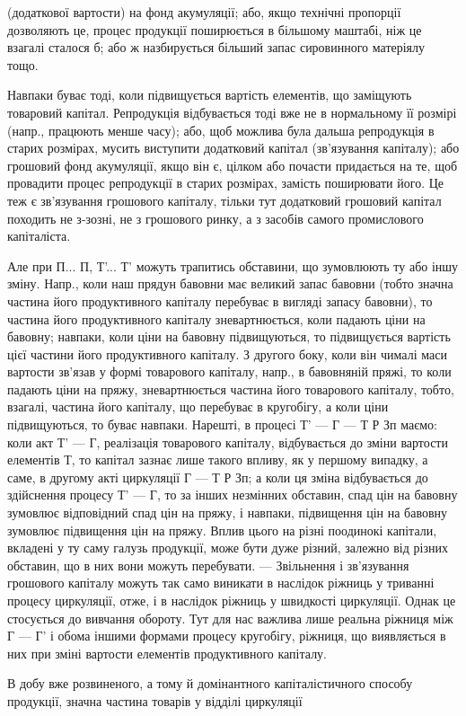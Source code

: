 \parcont{}  %
(додаткової вартости) на фонд акумуляції; або, якщо технічні пропорції
дозволяють це, процес продукції поширюється в більшому маштабі,
ніж це взагалі сталося б; або ж назбирується більший запас сировинного
матеріялу тощо.

Навпаки буває тоді, коли підвищується вартість елементів, що заміщують
товаровий капітал. Репродукція відбувається тоді вже не в нормальному
її розмірі (напр., працюють менше часу); або, щоб можлива
була дальша репродукція в старих розмірах, мусить виступити додатковий
капітал (зв’язування капіталу); або грошовий фонд акумуляції, якщо він
є, цілком або почасти придається на те, щоб провадити процес репродукції
в старих розмірах, замість поширювати його. Це теж є зв’язування
грошового капіталу, тільки тут додатковий грошовий капітал походить
не з-зозні, не з грошового ринку, а з засобів самого промислового
капіталіста.

Але при П... П, Т'... Т' можуть трапитись обставини, що зумовлюють
ту або іншу зміну. Напр., коли наш прядун бавовни має великий
запас бавовни (тобто значна частина його продуктивного капіталу
перебуває в вигляді запасу бавовни), то частина його продуктивного
капіталу зневартнюється, коли падають ціни на бавовну; навпаки, коли ціни
на бавовну підвищуються, то підвищується вартість цієї частини його
продуктивного капіталу. З другого боку, коли він чималі маси вартости
зв’язав у формі товарового капіталу, напр., в бавовняній пряжі, то коли
падають ціни на пряжу, зневартнюється частина його товарового капіталу,
тобто, взагалі, частина його капіталу, що перебуває в кругобігу, а коли
ціни підвищуються, то буває навпаки. Нарешті, в процесі Т' — Г — Т Р Зп
маємо: коли акт Т' — Г, реалізація товарового капіталу, відбувається до
зміни вартости елементів Т, то капітал зазнає лише такого впливу, як у першому
випадку, а саме, в другому акті циркуляції Г — Т Р Зп; а коли
ця зміна відбувається до здійснення процесу Т' — Г, то за інших незмінних
обставин, спад цін на бавовну зумовлює відповідний спад цін на пряжу,
і навпаки, підвищення цін на бавовну зумовлює підвищення цін на пряжу.
Вплив цього на різні поодинокі капітали, вкладені у ту саму галузь
продукції, може бути дуже різний, залежно від різних обставин, що в них
вони можуть перебувати. — Звільнення і зв’язування грошового капіталу
можуть так само виникати в наслідок ріжниць у триванні процесу циркуляції,
отже, і в наслідок ріжниць у швидкості циркуляції. Однак це
стосується до вивчання обороту. Тут для нас важлива лише реальна
ріжниця між Г — Г' і обома іншими формами процесу кругобігу,
ріжниця, що виявляється в них при зміні вартости елементів продуктивного
капіталу.

В добу вже розвиненого, а тому й домінантного капіталістичного
способу продукції, значна частина товарів у відділі циркуляції
\parbreak{}  %
